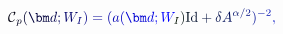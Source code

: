 \documentclass[12pt]{article}
\begin{document}
\makeatletter
\renewcommand*{\@textcolor}[3]{%
  \protect\leavevmode
  \begingroup
    \color#1{#2}#3%
  \endgroup
}
\makeatother
\begin{displaymath}
\mathcal { \mathcolor[RGB]{0,0,15}{C} } _ { \mathcolor[RGB]{0,0,30}{p} } \mathcolor[RGB]{0,0,45}{(} \mathcolor[RGB]{0,0,60}{\bm} { \mathcolor[RGB]{0,0,75}{d} } \mathcolor[RGB]{0,0,90}{;} \mathcolor[RGB]{0,0,105}{W} _ { \mathcolor[RGB]{0,0,120}{I} } \mathcolor[RGB]{0,0,135}{)} \mathcolor[RGB]{0,0,150}{=} \mathcolor[RGB]{0,0,165}{(} \mathcolor[RGB]{0,0,180}{a} \mathcolor[RGB]{0,0,195}{(} \mathcolor[RGB]{0,0,210}{\bm} { \mathcolor[RGB]{0,0,225}{d} } \mathcolor[RGB]{0,0,240}{;} \mathcolor[RGB]{0,0,255}{W} _ { \mathcolor[RGB]{0,15,0}{I} } \mathcolor[RGB]{0,15,15}{)} \mathrm { \mathcolor[RGB]{0,15,30}{I} \mathcolor[RGB]{0,15,45}{d} } \mathcolor[RGB]{0,15,60}{+} \mathcolor[RGB]{0,15,75}{\delta} \mathcolor[RGB]{0,15,90}{A} ^ { \mathcolor[RGB]{0,15,105}{\alpha} \mathcolor[RGB]{0,15,120}{/} \mathcolor[RGB]{0,15,135}{2} } \mathcolor[RGB]{0,15,150}{)} ^ { \mathcolor[RGB]{0,15,165}{-} \mathcolor[RGB]{0,15,180}{2} } \mathcolor[RGB]{0,15,195}{,}
\end{displaymath}
\end{document}
